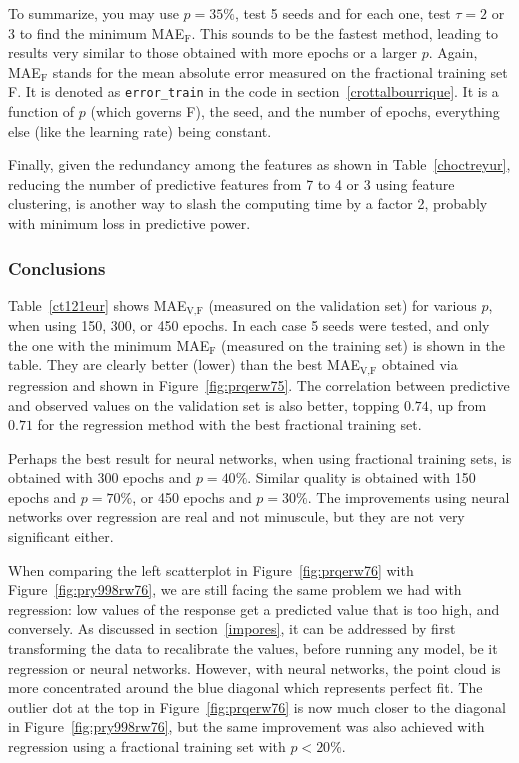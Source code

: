 \documentclass[oneside,10pt]{book}
\begin{document}
To summarize, you may use $p=35\%$, test 5 seeds and for each one, 
 test $\tau = 2$ or $3$ to find the minimum MAE$_\text{F}$. This sounds to be the fastest method, 
 leading to results very similar to those obtained with more epochs or a larger $p$. 
Again, MAE$_\text{F}$ stands for the mean absolute error measured on the fractional training set F. It is denoted as \texttt{error\_train} in the code
 in section~\ref{crottalbourrique}. It is a function of $p$ (which governs F), the seed, and the number of epochs, everything else (like the learning rate) being constant. 

Finally, given the redundancy among the features as shown in Table~\ref{choctreyur}, reducing the number of predictive features
 from 7 to 4 or 3 using \textcolor{index}{feature clustering}, is another way to slash the computing time by a factor 2, probably with minimum loss in predictive
 power. 

\subsubsection{Conclusions}

Table~\ref{ct121eur} shows MAE$_{\text{V,F}}$ (measured on the validation set) for various $p$, when using 150, 300, or 450 epochs. In each case 5 seeds were tested, and only the one with the minimum MAE$_\text{F}$ (measured on the training set) is shown in the table. They are clearly better (lower) than the best MAE$_{\text{V,F}}$ obtained via regression and shown in Figure~\ref{fig:prqerw75}. The correlation between predictive and observed values on the validation set is also better, topping $0.74$, up from $0.71$ for the regression method with the best fractional training set. 






Perhaps the best result for neural networks, when using fractional training sets, is obtained with 300 epochs and $p=40\%$. Similar quality is obtained with 150 epochs and $p=70\%$, or 450 epochs and $p=30\%$. The improvements using neural networks over regression are real and not minuscule, but they are not
 very significant either. 

When comparing the left scatterplot in Figure~\ref{fig:prqerw76} with Figure~\ref{fig:pry998rw76}, we are still facing the same problem we had with regression:
  low values of the response get a predicted value that is too high, and conversely.  As discussed in section~\ref{impores}, it can be addressed by first transforming 
 the data to recalibrate the values, before running any model, be it regression or neural networks. However, with neural networks, the point cloud is more concentrated around the blue diagonal which represents perfect fit. The outlier dot at the top in Figure~\ref{fig:prqerw76} is now much closer 
to the diagonal in Figure~\ref{fig:pry998rw76}, but the same improvement was also achieved with regression using a fractional training set with $p<20\%$.
\end{document}
